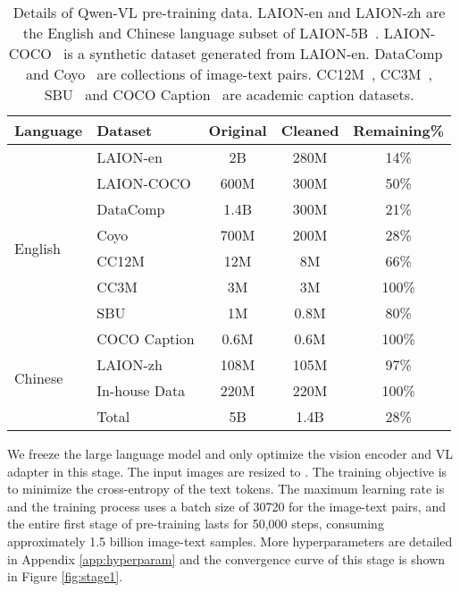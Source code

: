 \documentclass{article}
\newcommand{\tablestyle}[2]{\setlength{\tabcolsep}{#1}\renewcommand{\arraystretch}{#2}\centering\footnotesize}
\begin{document}
\begin{table}[ht]
    \centering
    \caption{Details of Qwen-VL pre-training data. LAION-en and LAION-zh are the English 
 and Chinese language subset of LAION-5B~\citep{laion5b}. LAION-COCO~\citep{laioncoco} is a synthetic dataset generated from LAION-en. DataComp~\citep{datacomp} and Coyo~\citep{coyo} are collections of image-text pairs. CC12M~\citep{cc12m}, CC3M~\citep{cc3m}, SBU~\citep{sbu} and COCO Caption~\citep{cococaption} are academic caption datasets.} 
    \tablestyle{6pt}{1.1}
    \begin{tabular}{ll ccc}
         \toprule
         \textbf{Language} & \textbf{Dataset} & \textbf{Original} & \textbf{Cleaned} & \textbf{Remaining\%} \\
         \midrule
         \multirow{8}{*}{English} & LAION-en     & 2B       & 280M & 14\% \\
         & LAION-COCO   & 600M     & 300M & 50\% \\
         & DataComp     & 1.4B     & 300M & 21\% \\
         & Coyo         & 700M     & 200M & 28\% \\
         & CC12M        & 12M      & 8M   & 66\% \\
         & CC3M         & 3M       & 3M   & 100\% \\
         & SBU          & 1M       & 0.8M & 80\% \\
         & COCO Caption & 0.6M     & 0.6M & 100\% \\
         \midrule
         \multirow{2}{*}{Chinese} & LAION-zh     & 108M     & 105M & 97\% \\
         & \color{dt}In-house Data & \color{dt}220M & \color{dt}220M & \color{dt}100\% \\
         \midrule
          & Total        & 5B     & 1.4B & 28\% \\
         \bottomrule
    \end{tabular}
    \label{tab:pretraining_data}
\end{table}

We freeze the large language model and only optimize the vision encoder and VL adapter in this stage. The input images are resized to . The training objective is to minimize the cross-entropy of the text tokens. The maximum learning rate is  and the training process uses a batch size of 30720 for the image-text pairs, and the entire first stage of pre-training lasts for 50,000 steps, consuming approximately 1.5 billion image-text samples. More hyperparameters are detailed in Appendix \ref{app:hyperparam} and the convergence curve of this stage is shown in Figure \ref{fig:stage1}.
\end{document}
